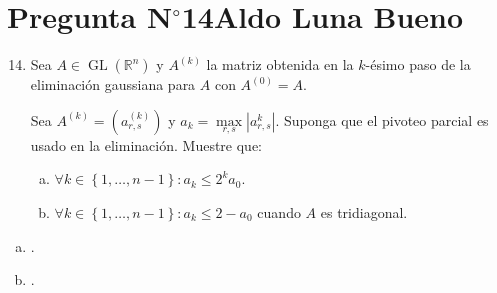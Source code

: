 \section{Pregunta N$^{\circ}$14\qquad Aldo Luna Bueno}

\begin{frame}
	\begin{enumerate}\setcounter{enumi}{13}
		\item

		      Sea $A\in\operatorname{GL}\left(\mathbb{R}^{n}\right)$ y
		      $A^{\left(k\right)}$ la matriz obtenida en la $k$-ésimo
		      paso de la eliminación gaussiana para $A$ con
		      $A^{\left(0\right)}=A$.

		      Sea
		      \begin{math}
			      A^{\left(k\right)}=
			      \left(
			      a_{r,s}^{\left(k\right)}
			      \right)
		      \end{math}
		      y
		      \begin{math}
			      a_{k}=
			      \max\limits_{r,s}
			      \left|
			      a_{r,s}^{k}
			      \right|
		      \end{math}.
		      Suponga que el pivoteo parcial es usado en la eliminación.
		      Muestre que:

		      \begin{enumerate}[a)]
			      \item

			            \begin{math}
				            \forall k\in
				            \left\{1,\dotsc,n-1\right\}:
				            a_{k}\leq
				            2^{k}a_{0}
			            \end{math}.

			      \item

			            \begin{math}
				            \forall k\in
				            \left\{1,\dotsc,n-1\right\}:
				            a_{k}\leq 2-a_{0}
			            \end{math}
			            cuando $A$ es tridiagonal.
		      \end{enumerate}
	\end{enumerate}
	\begin{solution}

		\begin{enumerate}[a)]
			\item

			      .

			\item

			      .
		\end{enumerate}

	\end{solution}
\end{frame}
